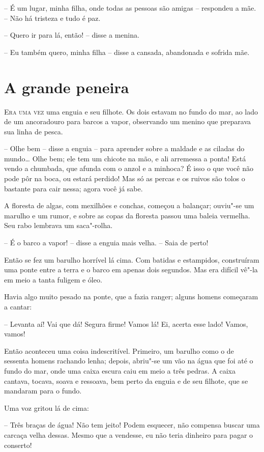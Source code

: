 -- É um lugar, minha filha, onde todas as pessoas são amigas -- respondeu
a mãe. -- Não há tristeza e tudo é paz.

-- Quero ir para lá, então! -- disse a menina.

-- Eu também quero, minha filha  -- disse a cansada, abandonada e sofrida mãe.

\oneside

\chapter{A grande peneira}
\vspace{0.9em}

\textsc{Era uma vez} uma enguia e seu filhote. Os dois estavam no fundo do mar,
ao lado de um ancoradouro para barcos a vapor, observando um menino que
preparava sua linha de pesca.

-- Olhe bem -- disse a enguia -- para aprender sobre a maldade e as
ciladas do mundo\ldots{} Olhe bem; ele tem um chicote na mão, e ali
arremessa a ponta! Está vendo a chumbada, que afunda com o anzol e a
minhoca? É isso o que você não pode pôr na boca, ou estará perdido! Mas
só as percas e os ruivos são tolos o bastante para cair nessa; agora
você já sabe.

A floresta de algas, com mexilhões e conchas, começou a balançar;
ouviu"-se um marulho e um rumor, e sobre as copas da floresta passou
uma baleia vermelha. Seu rabo lembrava um saca"-rolha.

-- É o barco a vapor! -- disse a enguia mais velha. -- Saia de perto!

Então se fez um barulho horrível lá cima. Com batidas e estampidos,
construíram uma ponte entre a terra e o barco em apenas dois segundos.
Mas era difícil vê"-la em meio a tanta fuligem e óleo. 

Havia algo muito pesado na ponte, que a fazia ranger; alguns homens
começaram a cantar:

-- Levanta aí! Vai que dá! Segura firme! Vamos lá! Ei,
acerta esse lado! Vamos, vamos!

Então aconteceu uma coisa indescritível. Primeiro, um barulho como o de
sessenta homens rachando lenha; depois, abriu"-se um vão na água que
foi até o fundo do mar, onde uma caixa escura caiu em meio a três
pedras. A caixa cantava, tocava, soava e ressoava, bem perto da enguia
e de seu filhote, que se mandaram para o fundo. 

Uma voz gritou lá de cima:

-- Três braças de água! Não tem jeito! Podem esquecer, não compensa
buscar uma carcaça velha dessas. Mesmo que a vendesse, eu não teria
dinheiro para pagar o conserto!

